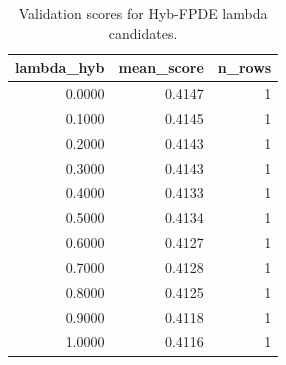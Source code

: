 \begin{table}[t]
\caption{Validation scores for Hyb-FPDE lambda candidates.}
\label{tab:lambda_distribution_computed}
\centering
\begin{tabular}{rrr}
\toprule
lambda\_hyb & mean\_score & n\_rows \\
\midrule
0.0000 & 0.4147 & 1 \\
0.1000 & 0.4145 & 1 \\
0.2000 & 0.4143 & 1 \\
0.3000 & 0.4143 & 1 \\
0.4000 & 0.4133 & 1 \\
0.5000 & 0.4134 & 1 \\
0.6000 & 0.4127 & 1 \\
0.7000 & 0.4128 & 1 \\
0.8000 & 0.4125 & 1 \\
0.9000 & 0.4118 & 1 \\
1.0000 & 0.4116 & 1 \\
\bottomrule
\end{tabular}

\end{table}
